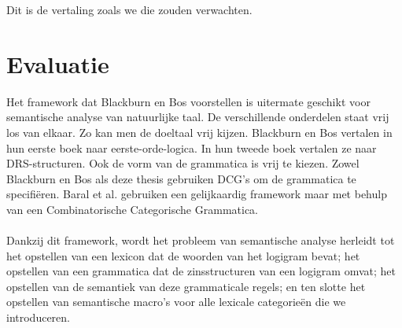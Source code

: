 Dit is de vertaling zoals we die zouden verwachten.

\section{Evaluatie}
Het framework dat Blackburn en Bos voorstellen is uitermate geschikt voor semantische analyse van natuurlijke taal. De verschillende onderdelen staat vrij los van elkaar. Zo kan men de doeltaal vrij kijzen. Blackburn en Bos vertalen in hun eerste boek \cite{Blackburn2005} naar eerste-orde-logica. In hun tweede boek \cite{Blackburn2006} vertalen ze naar DRS-structuren. Ook de vorm van de grammatica is vrij te kiezen. Zowel Blackburn en Bos als deze thesis gebruiken DCG's om de grammatica te specifiëren. Baral et al. \cite{Baral2008} gebruiken een gelijkaardig framework maar met behulp van een Combinatorische Categorische Grammatica.

\paragraph{} Dankzij dit framework, wordt het probleem van semantische analyse herleidt tot het opstellen van een lexicon dat de woorden van het logigram bevat; het opstellen van een grammatica dat de zinsstructuren van een logigram omvat; het opstellen van de semantiek van deze grammaticale regels; en ten slotte het opstellen van semantische macro's voor alle lexicale categorieën die we introduceren.
